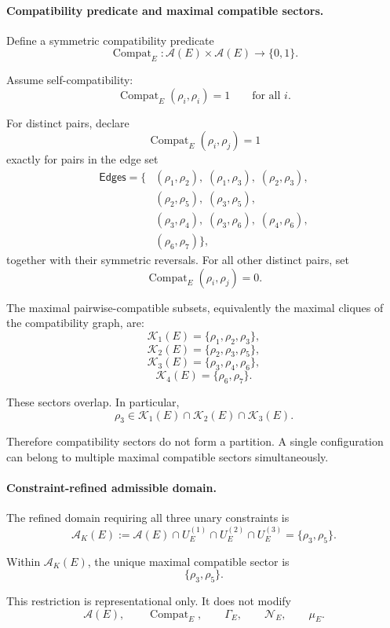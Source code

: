 \documentclass[aps,prx,onecolumn,11pt]{revtex4-2}
\theoremstyle{plain}
\theoremstyle{definition}
\theoremstyle{remark}
\newcommand{\Compat}{\operatorname{Compat}} %
\begin{document}
\paragraph{Compatibility predicate and maximal compatible sectors.}

Define a symmetric compatibility predicate
\[
\Compat_E:\mathcal A(E)\times\mathcal A(E)\to\{0,1\}.
\]

Assume self-compatibility:
\[
\Compat_E(\rho_i,\rho_i)=1
\qquad
\text{for all }i.
\]

For distinct pairs, declare
\[
\Compat_E(\rho_i,\rho_j)=1
\]
exactly for pairs in the edge set
\[
\begin{aligned}
\mathsf{Edges}
=
\{
&(\rho_1,\rho_2),\;(\rho_1,\rho_3),\;(\rho_2,\rho_3),\\
&(\rho_2,\rho_5),\;(\rho_3,\rho_5),\\
&(\rho_3,\rho_4),\;(\rho_3,\rho_6),\;(\rho_4,\rho_6),\\
&(\rho_6,\rho_7)
\},
\end{aligned}
\]
together with their symmetric reversals. For all other distinct pairs,
set
\[
\Compat_E(\rho_i,\rho_j)=0.
\]

The maximal pairwise-compatible subsets, equivalently the maximal
cliques of the compatibility graph, are:
\[
\mathcal K_1(E)
=
\{\rho_1,\rho_2,\rho_3\},
\]
\[
\mathcal K_2(E)
=
\{\rho_2,\rho_3,\rho_5\},
\]
\[
\mathcal K_3(E)
=
\{\rho_3,\rho_4,\rho_6\},
\]
\[
\mathcal K_4(E)
=
\{\rho_6,\rho_7\}.
\]

These sectors overlap. In particular,
\[
\rho_3
\in
\mathcal K_1(E)
\cap
\mathcal K_2(E)
\cap
\mathcal K_3(E).
\]

Therefore compatibility sectors do not form a partition. A single
configuration can belong to multiple maximal compatible sectors
simultaneously.

\paragraph{Constraint-refined admissible domain.}

The refined domain requiring all three unary constraints is
\[
\mathcal A_K(E)
:=
\mathcal A(E)
\cap
U^{(1)}_E
\cap
U^{(2)}_E
\cap
U^{(3)}_E
=
\{\rho_3,\rho_5\}.
\]

Within \(\mathcal A_K(E)\), the unique maximal compatible sector is
\[
\{\rho_3,\rho_5\}.
\]

This restriction is representational only. It does not modify
\[
\mathcal A(E),
\qquad
\Compat_E,
\qquad
\Gamma_E,
\qquad
\mathcal N_E,
\qquad
\mu_E.
\]
\end{document}
